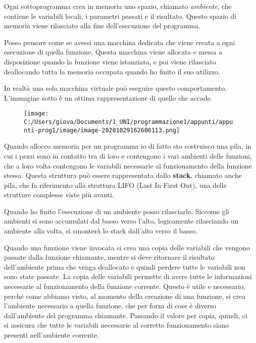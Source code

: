 \documentclass[
]{article}
\begin{document}
Ogni sottoprogramma crea in memoria uno spazio, chiamato
\emph{ambiente}, che contiene le variabili locali, i parametri passati e
il risultato. Questo spazio di memoria viene rilasciato alla fine
dell'esecuzione del programma.

Posso pensare come se avessi una macchina dedicata che viene creata a
ogni esecuzione di quella funzione. Questa macchina viene allocata e
messa a disposizione quando la funzione viene istanziata, e poi viene
rilasciato deallocando tutta la memoria occupata quando ho finito il suo
utilizzo.

In realtà una sola macchina virtuale può eseguire questo comportamento.
L'immagine sotto è un ottima rappresentazione di quello che accade.

\begin{figure}
\centering
\texttt{[image: C:/Users/giova/Documents/1\_UNI/programmazione1/appunti/appunti-prog1/image/image-20201029162606113.png]}
\caption{}
\end{figure}

Quando allocco memoria per un programma io di fatto sto costruisco una
pila, in cui i pezzi sono in contatto tra di loro e contengono i vari
ambienti delle funzioni, che a loro volta contengono le variabili
necessarie al funzionamento della funzione stessa. Questa struttura può
essere rappresentata dallo \textbf{stack}, chiamato anche pila, che fa
riferimento alla struttura LIFO (Last In First Out), una delle strutture
complesse viste più avanti.

Quando ho finito l'esecuzione di un ambiente posso rilasciarlo. Siccome
gli ambienti si sono accumulati dal basso verso l'alto, logicamente
rilasciando un ambiente alla volta, si smonterà lo stack dall'alto verso
il basso.

Quando una funzione viene invocata si crea una copia delle variabili che
vengono passate dalla funzione chiamante, mentre si deve ritornare il
risultato dell'ambiente prima che venga deallocato e quindi perdere
tutte le variabili non sono state passate. La copia delle variabili
permette di avere tutte le informazioni necessarie al funzionamento
della funzione corrente. Questo è utile e necessario, perché come
abbiamo visto, al momento della creazione di una funzione, si crea
l'ambiente necessario a quella funzione, che per forza di cose è diverso
dall'ambiente del programma chiamante. Passando il valore per copia,
quindi, ci si assicura che tutte le variabili necessarie al corretto
funzionamento siano presenti nell'ambiente corrente.
\end{document}
